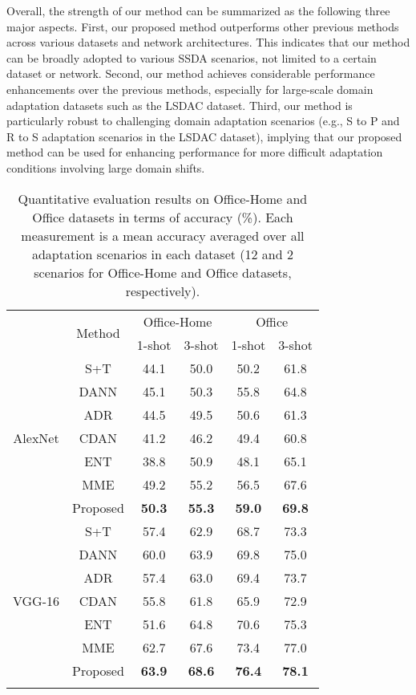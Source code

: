 \documentclass[a4paper,conference]{IEEEtran}
\begin{document}
Overall, the strength of our method can be summarized as the following three major aspects. First, our proposed method outperforms other previous methods across various datasets and network architectures. This indicates that our method can be broadly adopted to various SSDA scenarios, not limited to a certain dataset or network. Second, our method achieves considerable performance enhancements over the previous methods, especially for large-scale domain adaptation datasets such as the LSDAC dataset. Third, our method is particularly robust to challenging domain adaptation scenarios (e.g., S to P and R to S adaptation scenarios in the LSDAC dataset), implying that our proposed method can be used for enhancing performance for more difficult adaptation conditions involving large domain shifts.




\begin{table}[!t]
\centering
\caption{Quantitative evaluation results on Office-Home and Office datasets in terms of accuracy (\%). Each measurement is a mean accuracy averaged over all adaptation scenarios in each dataset (12 and 2 scenarios for Office-Home and Office datasets, respectively).}
\begin{tabular}{c|c|c@{\quad}c@{\quad}c@{\quad}c@{\quad}}
\Xhline{4\arrayrulewidth}
\multirow{2}{*}{Net} & \multirow{2}{*}{Method} & \multicolumn{2}{c}{Office-Home} & \multicolumn{2}{c}{Office}\\
& & 1-shot & 3-shot & 1-shot & 3-shot\\
\hline
\multirow{7}{*}{AlexNet} & S+T & 44.1 & 50.0 & 50.2 & 61.8\\
& DANN & 45.1 & 50.3 & 55.8 & 64.8\\
& ADR & 44.5 & 49.5 & 50.6 & 61.3\\
& CDAN & 41.2 & 46.2 & 49.4 & 60.8\\
& ENT & 38.8 & 50.9 & 48.1 & 65.1\\
& MME & 49.2 & 55.2 & 56.5 & 67.6\\
& Proposed & \textbf{50.3} & \textbf{55.3} & \textbf{59.0} & \textbf{69.8}\\
\hline\hline
\multirow{7}{*}{VGG-16} & S+T & 57.4 & 62.9 & 68.7 & 73.3\\
& DANN & 60.0 & 63.9 & 69.8 & 75.0\\
& ADR & 57.4 & 63.0 & 69.4 & 73.7\\
& CDAN & 55.8 & 61.8 & 65.9 & 72.9\\
& ENT & 51.6 & 64.8 & 70.6 & 75.3\\
& MME & 62.7 & 67.6 & 73.4 & 77.0\\
& Proposed & \textbf{63.9} & \textbf{68.6} & \textbf{76.4} & \textbf{78.1}\\
\Xhline{4\arrayrulewidth}
\end{tabular}
\label{tab:office}
\end{table}
\end{document}
